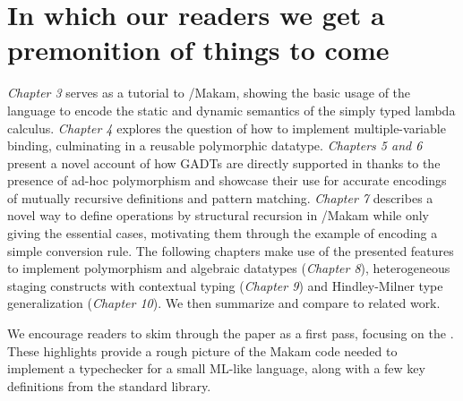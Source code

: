 \section{In which our readers we get a premonition of things to
come}\label{in-which-our-readers-we-get-a-premonition-of-things-to-come}

\identNormal

\emph{Chapter 3} serves as a tutorial to \lamprolog/Makam, showing the
basic usage of the language to encode the static and dynamic semantics
of the simply typed lambda calculus. \emph{Chapter 4} explores the
question of how to implement multiple-variable binding, culminating in a
reusable polymorphic datatype. \emph{Chapters 5 and 6} present a novel
account of how GADTs are directly supported in \lamprolog thanks to the
presence of ad-hoc polymorphism and showcase their use for accurate
encodings of mutually recursive definitions and pattern matching.
\emph{Chapter 7} describes a novel way to define operations by
structural recursion in \lamprolog/Makam while only giving the essential
cases, motivating them through the example of encoding a simple
conversion rule. The following chapters make use of the presented
features to implement polymorphism and algebraic datatypes
(\emph{Chapter 8}), heterogeneous staging constructs with contextual
typing (\emph{Chapter 9}) and Hindley-Milner type generalization
(\emph{Chapter 10}). We then summarize and compare to related work.

We encourage readers to skim through the paper as a first pass, focusing
on the . These highlights provide a
rough picture of the Makam code needed to implement a typechecker for a
small ML-like language, along with a few key definitions from the
standard library.

\identDialog

